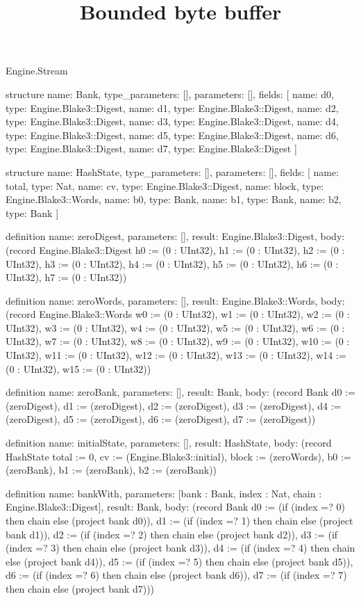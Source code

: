 \begin{lexlean}{Engine.Stream}
\title{Bounded byte buffer}
\begin{semanticmodule}
structure{
  name: Bank,
  type_parameters: [],
  parameters: [],
  fields: [
    {name: d0, type: Engine.Blake3::Digest},
    {name: d1, type: Engine.Blake3::Digest},
    {name: d2, type: Engine.Blake3::Digest},
    {name: d3, type: Engine.Blake3::Digest},
    {name: d4, type: Engine.Blake3::Digest},
    {name: d5, type: Engine.Blake3::Digest},
    {name: d6, type: Engine.Blake3::Digest},
    {name: d7, type: Engine.Blake3::Digest}
  ]
}

structure{
  name: HashState,
  type_parameters: [],
  parameters: [],
  fields: [
    {name: total, type: Nat},
    {name: cv, type: Engine.Blake3::Digest},
    {name: block, type: Engine.Blake3::Words},
    {name: b0, type: Bank},
    {name: b1, type: Bank},
    {name: b2, type: Bank}
  ]
}

definition{
  name: zeroDigest,
  parameters: [],
  result: Engine.Blake3::Digest,
  body: (record Engine.Blake3::Digest {h0 := (0 : UInt32), h1 := (0 : UInt32), h2 := (0 : UInt32), h3 := (0 : UInt32), h4 := (0 : UInt32), h5 := (0 : UInt32), h6 := (0 : UInt32), h7 := (0 : UInt32)})
}

definition{
  name: zeroWords,
  parameters: [],
  result: Engine.Blake3::Words,
  body: (record Engine.Blake3::Words {w0 := (0 : UInt32), w1 := (0 : UInt32), w2 := (0 : UInt32), w3 := (0 : UInt32), w4 := (0 : UInt32), w5 := (0 : UInt32), w6 := (0 : UInt32), w7 := (0 : UInt32), w8 := (0 : UInt32), w9 := (0 : UInt32), w10 := (0 : UInt32), w11 := (0 : UInt32), w12 := (0 : UInt32), w13 := (0 : UInt32), w14 := (0 : UInt32), w15 := (0 : UInt32)})
}

definition{
  name: zeroBank,
  parameters: [],
  result: Bank,
  body: (record Bank {d0 := (zeroDigest), d1 := (zeroDigest), d2 := (zeroDigest), d3 := (zeroDigest), d4 := (zeroDigest), d5 := (zeroDigest), d6 := (zeroDigest), d7 := (zeroDigest)})
}

definition{
  name: initialState,
  parameters: [],
  result: HashState,
  body: (record HashState {total := 0, cv := (Engine.Blake3::initial), block := (zeroWords), b0 := (zeroBank), b1 := (zeroBank), b2 := (zeroBank)})
}

definition{
  name: bankWith,
  parameters: [bank : Bank, index : Nat, chain : Engine.Blake3::Digest],
  result: Bank,
  body: (record Bank {d0 := (if (index =? 0) then chain else (project bank d0)), d1 := (if (index =? 1) then chain else (project bank d1)), d2 := (if (index =? 2) then chain else (project bank d2)), d3 := (if (index =? 3) then chain else (project bank d3)), d4 := (if (index =? 4) then chain else (project bank d4)), d5 := (if (index =? 5) then chain else (project bank d5)), d6 := (if (index =? 6) then chain else (project bank d6)), d7 := (if (index =? 7) then chain else (project bank d7))})
}


\end{semanticmodule}
\end{lexlean}
